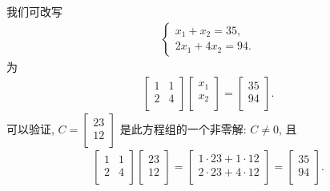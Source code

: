 \begin{example}
    我们可改写
    \begin{align*}
        \begin{cases}
            x_1 + x_2 = 35, \\
            2x_1 + 4x_2 = 94.
        \end{cases}
    \end{align*}
    为
    \begin{align*}
        \begin{bmatrix}
            1 & 1 \\
            2 & 4 \\
        \end{bmatrix}
        \begin{bmatrix}
            x_1 \\
            x_2 \\
        \end{bmatrix}
        =
        \begin{bmatrix}
            35 \\
            94 \\
        \end{bmatrix}.
    \end{align*}
    可以验证,
    \(
    C = \begin{bmatrix}
        23 \\
        12 \\
    \end{bmatrix}
    \)
    是此方程组的一个非零解:
    \(C \neq 0\), 且
    \begin{align*}
        \begin{bmatrix}
            1 & 1 \\
            2 & 4 \\
        \end{bmatrix}
        \begin{bmatrix}
            23 \\
            12 \\
        \end{bmatrix}
        =
        \begin{bmatrix}
            1 \cdot 23 + 1 \cdot 12 \\
            2 \cdot 23 + 4 \cdot 12 \\
        \end{bmatrix}
        =
        \begin{bmatrix}
            35 \\
            94 \\
        \end{bmatrix}.
    \end{align*}


\end{example}
